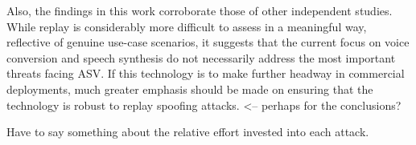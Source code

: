 Also, the findings in this work corroborate those of other independent studies.  While replay is considerably more difficult to assess in a meaningful way, reflective of genuine use-case scenarios, it suggests that the current focus on voice conversion and speech synthesis do not necessarily address the most important threats facing ASV.  If this technology is to make further headway in commercial deployments, much greater emphasis should be made on ensuring that the technology is robust to replay spoofing attacks. <-- perhaps for the conclusions?

Have to say something about the relative effort invested into each attack.